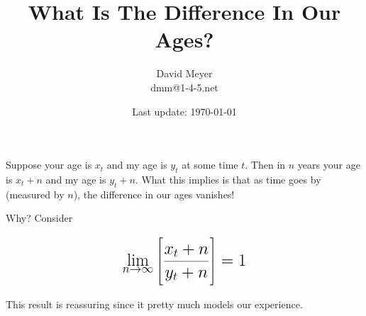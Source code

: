 \documentclass[11pt, oneside]{article}   	%
\title{What Is The Difference In Our Ages?}
\author{David Meyer \\ dmm@1-4-5.net}
\date{Last update: \today}							%
\theoremstyle{definition}
\begin{document}
\maketitle

\bigskip
\noindent
Suppose your age is $x_t$ and my age is $y_t$ at some time $t$. Then in $n$ years your age is $x_t + n$ and my age is $y_t + n$. What this implies
is that as time goes by (measured by $n$), the difference in our ages vanishes!

\bigskip
\noindent
Why? Consider

\medskip
\bigskip
\begin{equation*}
\centering
\mathlarger{\mathlarger{\mathlarger {\lim\limits_{n \to \infty} \Bigg [ \frac{x_t + n}{y_t + n} \Bigg ]  = 1}}}
\end{equation*}

\bigskip
\bigskip
\noindent
This result is reassuring since it pretty much models our experience. 
\end{document}
